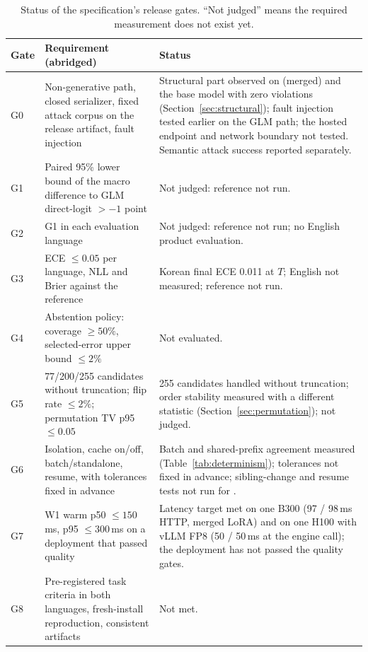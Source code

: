 \begin{table}[t]
\centering
\small
\caption{Status of the specification's release gates. ``Not judged'' means the required
measurement does not exist yet.}
\label{tab:gates}
\setlength{\tabcolsep}{4pt}
\begin{tabular}{@{}lp{4.6cm}p{7.2cm}@{}}
\toprule
Gate & Requirement (abridged) & Status \\
\midrule
G0 & Non-generative path, closed serializer, fixed attack corpus on the release artifact, fault injection & Structural part observed on \expone{} (merged) and the base model with zero violations (Section~\ref{sec:structural}); fault injection tested earlier on the GLM path; the hosted endpoint and network boundary not tested. Semantic attack success reported separately. \\
G1 & Paired 95\% lower bound of the macro difference to GLM direct-logit $> -1$ point & Not judged: reference not run. \\
G2 & G1 in each evaluation language & Not judged: reference not run; no English product evaluation. \\
G3 & ECE $\le 0.05$ per language, NLL and Brier against the reference & Korean final ECE 0.011 at $T$; English not measured; reference not run. \\
G4 & Abstention policy: coverage $\ge 50\%$, selected-error upper bound $\le 2\%$ & Not evaluated. \\
G5 & 77/200/255 candidates without truncation; flip rate $\le 2\%$; permutation TV p95 $\le 0.05$ & 255 candidates handled without truncation; order stability measured with a different statistic (Section~\ref{sec:permutation}); not judged. \\
G6 & Isolation, cache on/off, batch/standalone, resume, with tolerances fixed in advance & Batch and shared-prefix agreement measured (Table~\ref{tab:determinism}); tolerances not fixed in advance; sibling-change and resume tests not run for \expone{}. \\
G7 & W1 warm p50 $\le 150$\,ms, p95 $\le 300$\,ms on a deployment that passed quality & Latency target met on one B300 (97 / 98\,ms HTTP, merged LoRA) and on one H100 with vLLM FP8 (50 / 50\,ms at the engine call); the deployment has not passed the quality gates. \\
G8 & Pre-registered task criteria in both languages, fresh-install reproduction, consistent artifacts & Not met. \\
\bottomrule
\end{tabular}
\end{table}

